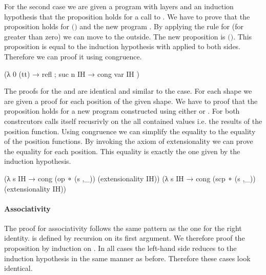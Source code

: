 \begin{AgdaAlign}
For the second case we are given a program  with
\AgdaSpace{} layers and an
induction hypothesis  that the proposition holds for a call to
\AgdaSpace{}.
We have to prove that the proposition holds for
\AgdaSpace{}$($\AgdaSpace{}$)$
and the new program \AgdaSpace{}.
By applying the \AgdaFunction{>>=} rule for  (for
 greater than zero) we can move 
to the outside.
The new proposition is
\AgdaSpace{}$($\AgdaSpace{}$)$\AgdaSpace{}\AgdaSpace{}\AgdaSpace{}.
This proposition is equal to the induction hypothesis with
 applied to both sides.
Therefore we can proof it using congruence.

\begin{code}
  (λ{ {0} (tt) → refl ; {suc n} IH → cong var IH })
\end{code}
The proofs for the  and
 are identical and similar to the
 case. For each shape  we are
given a proof for each position of the given shape.
We have to proof that the proposition holds for a new program constructed using
either  or .
For both constrcutors \AgdaSpace{} calls
itself recusrivly on the all contained values i.e. the results of the position
function.
Using congruence we can simplify the equality to the equality of the position
functions.
By invoking the axiom of extensionality we can prove the equality for each
position.
This equality is exactly the one given by the induction hypothesis.

\begin{code}
  (λ s IH → cong (op   ∘ (s ,_)) (extensionality IH))
  (λ s IH → cong (scp  ∘ (s ,_)) (extensionality IH))
\end{code}
\end{AgdaAlign}

\paragraph{Associativity}
The proof for associativity follows the same pattern as the one for the right
identity.
\AgdaFunction{>>=} is defined by recursion on its first argument.
We therefore proof the proposition by induction on .
In all cases the left-hand side reduces to the induction hypothesis in the same
manner as before.
Therefore these cases look identical.

